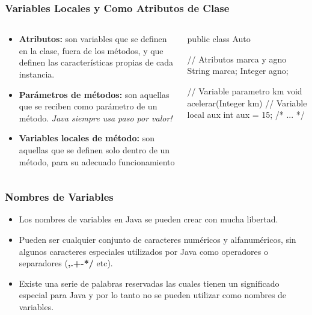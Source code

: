 \documentclass{beamer}
\begin{document}
\begin{frame}[fragile]
  \frametitle{Variables Locales y Como Atributos de Clase}

  \begin{columns}    
    \begin{column}{0.4\textwidth}
      \begin{small}
      \begin{itemize}
      \item \textbf{Atributos:} son variables que se definen en la
        clase, fuera de los métodos, y que definen las características
        propias de cada instancia.

        
      \item \textbf{Parámetros de métodos:} son aquellas que se
        reciben como parámetro de un método. \emph{Java siempre usa
          paso por valor!}
        
      \item \textbf{Variables locales de método:} son aquellas que se
        definen solo dentro de un método, para su adecuado
        funcionamiento
        
      \end{itemize}
      \end{small}
      
    \end{column}
    \begin{column}{0.6\textwidth}
      \begin{jsmall}
        public class Auto {
          // Atributos marca y agno
          String marca;
          Integer agno;

          // Variable parametro km
          void acelerar(Integer km) {
            // Variable local aux
            int aux = 15;
            /* ... */
          }
        }        
      \end{jsmall}      
    \end{column}
  \end{columns}

\end{frame}

\begin{frame}
  \frametitle{Nombres de Variables}
    \begin{itemize}
    \item Los nombres de variables en Java se pueden crear con mucha
      libertad.
      
    \item Pueden ser cualquier conjunto de caracteres numéricos y
      alfanuméricos, sin algunos caracteres especiales utilizados por
      Java como operadores o separadores (\textbf{,.+-*/} etc).
      
    \item Existe una serie de palabras reservadas las cuales tienen un
      significado especial para Java y por lo tanto no se pueden
      utilizar como nombres de variables.
      
    \end{itemize}
\end{frame}
\end{document}
